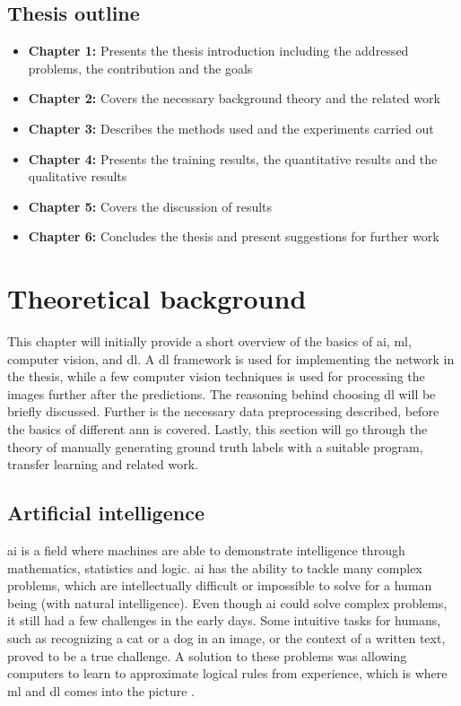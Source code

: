 \documentclass[USenglish]{ifimaster}  %
\begin{document}
\section{Thesis outline}
\begin{itemize}
    \item \textbf{Chapter 1:}
    \newline
    Presents the thesis introduction including the addressed problems, the contribution and the goals
    \item \textbf{Chapter 2:}
    \newline
    Covers the necessary background theory and the related work
    \item \textbf{Chapter 3:}
    \newline
    Describes the methods used and the experiments carried out
    \item \textbf{Chapter 4:}
    \newline
    Presents the training results, the quantitative results and the qualitative results
    \item \textbf{Chapter 5:}
    \newline
    Covers the discussion of results 
    \item \textbf{Chapter 6:}
    \newline
    Concludes the thesis and present suggestions for further work
\end{itemize}


\chapter{Theoretical background}
This chapter will initially provide a short overview of the basics of \ac{ai}, \ac{ml}, computer vision, and \acf{dl}. A \ac{dl} framework is used for implementing the network in the thesis, while a few computer vision techniques is used for processing the images further after the predictions. The reasoning behind choosing \ac{dl} will be briefly discussed. Further is the necessary data preprocessing described, before the basics of different \ac{ann} is covered. Lastly, this section will go through the theory of manually generating ground truth labels with a suitable program, transfer learning and related work.

\section{Artificial intelligence}
\ac{ai} is a field where machines are able to demonstrate intelligence through mathematics, statistics and logic. \ac{ai} has the ability to tackle many complex problems, which are intellectually difficult or impossible to solve for a human being (with natural intelligence). Even though \ac{ai} could solve complex problems, it still had a few challenges in the early days. Some intuitive tasks for humans, such as recognizing a cat or a dog in an image, or the context of a written text, proved to be a true challenge. A solution to these problems was allowing computers to learn to approximate logical rules from experience, which is where \ac{ml} and \ac{dl} comes into the picture \cite{The_holy_grail_of_DL}.
\end{document}
